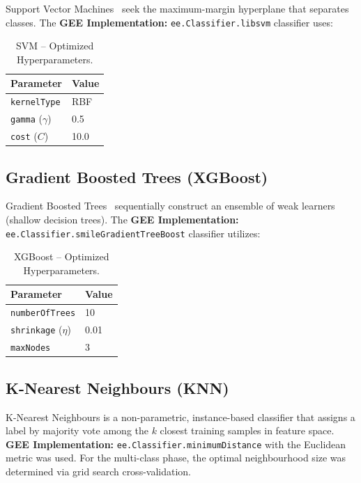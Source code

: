 \documentclass[12pt, a4paper, twocolumn]{article}
\begin{document}
Support Vector Machines~\cite{cortes1995support} seek the maximum-margin hyperplane that separates classes.
The \textbf{GEE Implementation:} \texttt{ee.Classifier.libsvm} classifier uses:

\begin{table}[H]
\centering
\caption{SVM -- Optimized Hyperparameters.}
\label{tab:svm_params}
\begin{tabular}{@{}ll@{}}
\toprule
\textbf{Parameter} & \textbf{Value} \\
\midrule
\texttt{kernelType} & RBF \\
\texttt{gamma} ($\gamma$) & 0.5 \\
\texttt{cost} ($C$) & 10.0 \\
\bottomrule
\end{tabular}
\end{table}

\subsection{Gradient Boosted Trees (XGBoost)}
\label{subsec:xgb}

Gradient Boosted Trees~\cite{chen2016xgboost} sequentially construct an ensemble of weak learners (shallow decision trees).
The \textbf{GEE Implementation:} \texttt{ee.Classifier.smileGradientTreeBoost} classifier utilizes:

\begin{table}[H]
\centering
\caption{XGBoost -- Optimized Hyperparameters.}
\label{tab:xgb_params}
\begin{tabular}{@{}ll@{}}
\toprule
\textbf{Parameter} & \textbf{Value} \\
\midrule
\texttt{numberOfTrees} & 10 \\
\texttt{shrinkage} ($\eta$) & 0.01 \\
\texttt{maxNodes} & 3 \\
\bottomrule
\end{tabular}
\end{table}

\subsection{K-Nearest Neighbours (KNN)}
\label{subsec:knn}

K-Nearest Neighbours is a non-parametric, instance-based classifier that assigns a label by majority vote among the $k$ closest training samples in feature space.
\textbf{GEE Implementation:} \texttt{ee.Classifier.minimumDistance} with the Euclidean metric was used. For the multi-class phase, the optimal neighbourhood size was determined via grid search cross-validation.
\end{document}
